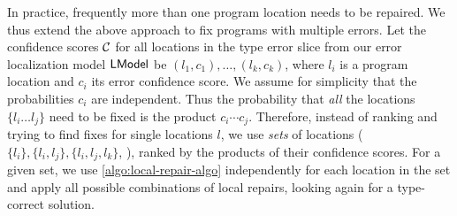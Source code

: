 In practice, frequently more than one program location needs to be repaired. We
thus extend the above approach to fix programs with multiple errors. Let the
confidence scores $\mathcal{C}$ for all locations in the type error slice from our
error localization model $\mathsf{LModel}$ be $(l_1, c_1), \dots, (l_k, c_k)$, where
$l_i$ is a program location and $c_i$ its error confidence score. We assume for
simplicity that the probabilities $c_i$ are independent. Thus the probability
that \emph{all} the locations $\{l_i \dots l_j\}$ need to be fixed is the
product $c_i \cdots c_j$. Therefore, instead of ranking and trying to find
fixes for single locations $l$, we use \emph{sets} of locations ($\{l_i\},
\{l_i, l_j\}, \{l_i, l_j, l_k\}$, \etc), ranked by the products of their
confidence scores. For a given set, we use \autoref{algo:local-repair-algo}
independently for each location in the set and apply all possible combinations
of local repairs, looking again for a type-correct solution.

\lstDeleteShortInline{|}
